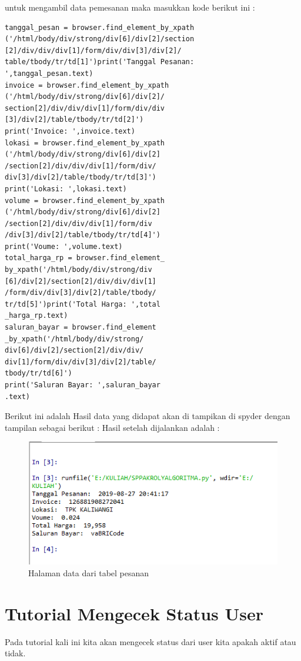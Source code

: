 untuk mengambil data pemesanan  maka masukkan kode berikut ini :
\begin{verbatim}
tanggal_pesan = browser.find_element_by_xpath
('/html/body/div/strong/div[6]/div[2]/section
[2]/div/div/div[1]/form/div/div[3]/div[2]/
table/tbody/tr/td[1]')print('Tanggal Pesanan:
',tanggal_pesan.text)
invoice = browser.find_element_by_xpath
('/html/body/div/strong/div[6]/div[2]/
section[2]/div/div/div[1]/form/div/div
[3]/div[2]/table/tbody/tr/td[2]')
print('Invoice: ',invoice.text)
lokasi = browser.find_element_by_xpath
('/html/body/div/strong/div[6]/div[2]
/section[2]/div/div/div[1]/form/div/
div[3]/div[2]/table/tbody/tr/td[3]')
print('Lokasi: ',lokasi.text)
volume = browser.find_element_by_xpath
('/html/body/div/strong/div[6]/div[2]
/section[2]/div/div/div[1]/form/div
/div[3]/div[2]/table/tbody/tr/td[4]')
print('Voume: ',volume.text)
total_harga_rp = browser.find_element_
by_xpath('/html/body/div/strong/div
[6]/div[2]/section[2]/div/div/div[1]
/form/div/div[3]/div[2]/table/tbody/
tr/td[5]')print('Total Harga: ',total
_harga_rp.text)
saluran_bayar = browser.find_element
_by_xpath('/html/body/div/strong/
div[6]/div[2]/section[2]/div/div/
div[1]/form/div/div[3]/div[2]/table/
tbody/tr/td[6]')
print('Saluran Bayar: ',saluran_bayar
.text)
\end{verbatim}

Berikut ini adalah Hasil data yang didapat 
akan di tampikan di spyder dengan tampilan sebagai berikut :
Hasil setelah dijalankan adalah :
\begin{figure}[h]
	\centering
	\includegraphics[scale=0.6]{figures/2tabelpesanan}
	\caption{Halaman data dari tabel pesanan}
\end{figure}


\newpage
\section{Tutorial Mengecek Status User}
Pada tutorial kali ini kita akan mengecek status dari user kita apakah aktif atau tidak.
